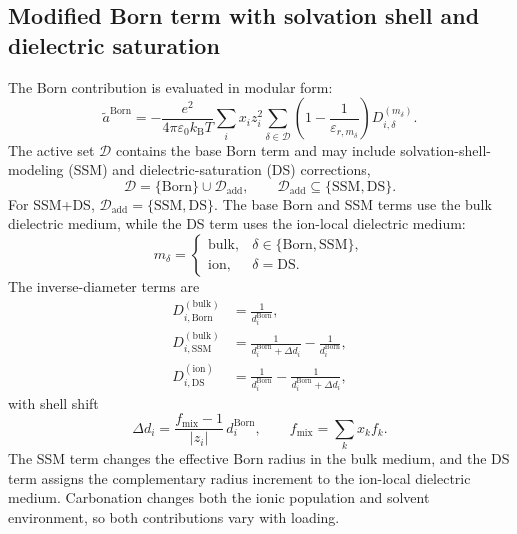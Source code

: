 \subsection{Modified Born term with solvation shell and dielectric saturation}
The Born contribution is evaluated in modular form:
\begin{equation}
    \tilde{a}^{\mathrm{Born}}
    =
    -\frac{e^2}{4\pi\varepsilon_0 k_{\mathrm{B}}T}
    \sum_i x_i z_i^2
    \sum_{\delta\in\mathcal{D}}
    \left(1-\frac{1}{\varepsilon_{r,m_\delta}}\right)
    D_{i,\delta}^{(m_\delta)} .
    \label{eq:epcsaft-born-modular}
\end{equation}
The active set \(\mathcal{D}\) contains the base Born term and may include solvation-shell-modeling (SSM) and dielectric-saturation (DS) corrections,
\begin{equation}
    \mathcal{D}
    =
    \{\mathrm{Born}\}\cup\mathcal{D}_{\mathrm{add}},
    \qquad
    \mathcal{D}_{\mathrm{add}}\subseteq\{\mathrm{SSM},\mathrm{DS}\}.
    \label{eq:epcsaft-born-active-set}
\end{equation}
For SSM+DS, \(\mathcal{D}_{\mathrm{add}}=\{\mathrm{SSM},\mathrm{DS}\}\).  The base Born and SSM terms use the bulk dielectric medium, while the DS term uses the ion-local dielectric medium:
\begin{equation}
    m_\delta=
    \begin{cases}
        \mathrm{bulk}, & \delta\in\{\mathrm{Born},\mathrm{SSM}\},\\
        \mathrm{ion}, & \delta=\mathrm{DS}.
    \end{cases}
    \label{eq:epcsaft-born-medium}
\end{equation}
The inverse-diameter terms are
\begin{align}
    D_{i,\mathrm{Born}}^{(\mathrm{bulk})}
    &=
    \frac{1}{d_i^{\mathrm{Born}}},
    \label{eq:epcsaft-born-base-dterm}\\
    D_{i,\mathrm{SSM}}^{(\mathrm{bulk})}
    &=
    \frac{1}{d_i^{\mathrm{Born}}+\Delta d_i}
    -
    \frac{1}{d_i^{\mathrm{Born}}},
    \label{eq:epcsaft-born-ssm-dterm}\\
    D_{i,\mathrm{DS}}^{(\mathrm{ion})}
    &=
    \frac{1}{d_i^{\mathrm{Born}}}
    -
    \frac{1}{d_i^{\mathrm{Born}}+\Delta d_i},
    \label{eq:epcsaft-born-ds-dterm}
\end{align}
with shell shift
\begin{equation}
    \Delta d_i
    =
    \frac{f_{\mathrm{mix}}-1}{|z_i|}\,d_i^{\mathrm{Born}},
    \qquad
    f_{\mathrm{mix}}=\sum_k x_k f_k .
    \label{eq:epcsaft-born-shell-shift}
\end{equation}
The SSM term changes the effective Born radius in the bulk medium, and the DS term assigns the complementary radius increment to the ion-local dielectric medium.  Carbonation changes both the ionic population and solvent environment, so both contributions vary with loading.

